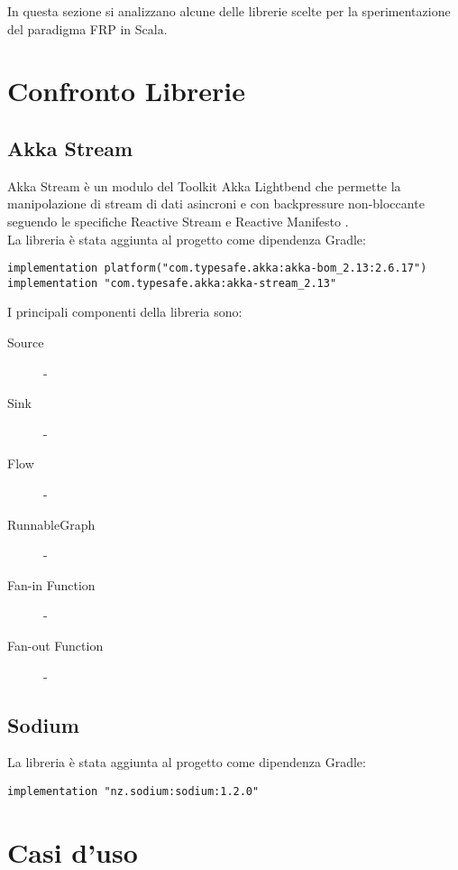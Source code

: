 \documentclass[../main.tex]{subfiles}
\begin{document}
In questa sezione si analizzano alcune delle librerie scelte per la sperimentazione del paradigma FRP in Scala.
\section{Confronto Librerie}
\subsection{Akka Stream}
Akka Stream è un modulo del Toolkit Akka Lightbend che permette la manipolazione di stream di dati asincroni e con backpressure non-bloccante seguendo le specifiche Reactive Stream \cite{frp4} e Reactive Manifesto \cite{frp3}.\\
La libreria è stata aggiunta al progetto come dipendenza Gradle:
\begin{lstlisting}[basicstyle=\small,caption={Dipendenze Akka Stream Gradle},captionpos=b,frame=single]
implementation platform("com.typesafe.akka:akka-bom_2.13:2.6.17")
implementation "com.typesafe.akka:akka-stream_2.13"
\end{lstlisting}

I principali componenti della libreria sono:
\begin{description}
  \item[Source] -
  \item[Sink] - 
  \item[Flow] - 
  \item[RunnableGraph] - 
  \item[Fan-in Function] -
  \item[Fan-out Function] -
\end{description}
\subsection{Sodium}
La libreria è stata aggiunta al progetto come dipendenza Gradle:
\begin{lstlisting}[basicstyle=\small,caption={Dipendenza Sodium Gradle},captionpos=b,frame=single]
implementation "nz.sodium:sodium:1.2.0"
\end{lstlisting}
\section{Casi d'uso}
\end{document}
